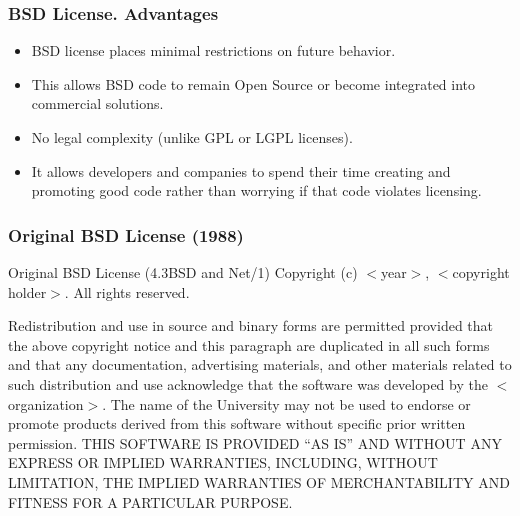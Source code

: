 
\begin{frame}
\frametitle{BSD License. Advantages}

\begin{itemize}
\item BSD license places minimal restrictions on future behavior.
\item This allows BSD code to remain Open Source or become integrated into commercial solutions.
\item No legal complexity (unlike GPL or LGPL licenses). 
\item It allows developers and companies to spend their time creating and promoting good code rather than worrying if that code violates licensing.
\end{itemize}

\end{frame}


\begin{frame}
\frametitle{Original BSD License (1988)}

\begin{block}{Original BSD License (4.3BSD and Net/1)}
Copyright (c) $<$year$>$, $<$copyright holder$>$. All rights reserved. 

\medskip

Redistribution and use in source and binary forms are permitted
provided that the above copyright notice and this paragraph are
duplicated in all such forms and that any documentation,
advertising materials, and other materials related to such
distribution and use acknowledge that the software was developed
by the $<$organization$>$.  The name of the
University may not be used to endorse or promote products derived
from this software without specific prior written permission.
THIS SOFTWARE IS PROVIDED ``AS IS'' AND WITHOUT ANY EXPRESS OR
IMPLIED WARRANTIES, INCLUDING, WITHOUT LIMITATION, THE IMPLIED
WARRANTIES OF MERCHANTABILITY AND FITNESS FOR A PARTICULAR PURPOSE.
 
\end{block}

\end{frame}


